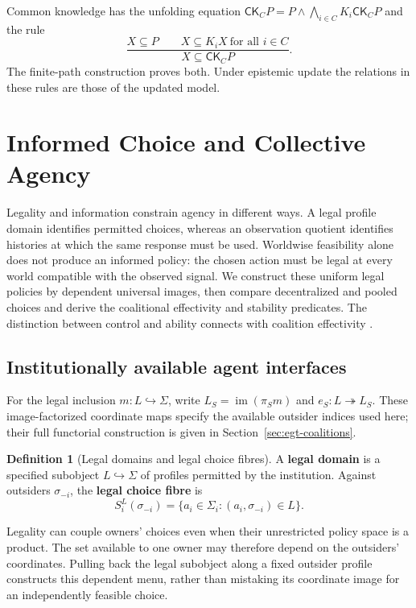 \documentclass[11pt,a4paper]{article}
\numberwithin{equation}{section}
\theoremstyle{definition}
\newtheorem{definition}[theorem]{Definition}
\theoremstyle{remark}
\theoremstyle{plain}
\providecommand{\CK}{\mathsf{CK}}
\begin{document}
Common knowledge has the unfolding equation
$\CK_CP=P\wedge\bigwedge_{i\in C}K_i\CK_CP$ and the rule
\[
 \frac{X\subseteq P\qquad X\subseteq K_iX\ \text{for all }i\in C}
      {X\subseteq\CK_CP}.
\]
The finite-path construction proves both. Under epistemic update the
relations in these rules are those of the updated model.

\section{Informed Choice and Collective Agency}\label{sec:paper-7}

Legality and information constrain agency in different ways. A legal
profile domain identifies permitted choices, whereas an observation
quotient identifies histories at which the same response must be used.
Worldwise feasibility alone does not produce an informed policy: the
chosen action must be legal at every world compatible with the observed
signal. We construct these uniform legal policies by dependent universal
images, then compare decentralized and pooled choices and derive the
coalitional effectivity and stability predicates. The distinction between
control and ability connects with coalition effectivity
\citep{Pauly2002}.

\subsection{Institutionally available agent interfaces}

For the legal inclusion $m:L\hookrightarrow\Sigma$, write
$L_S=\operatorname{im}(\pi_Sm)$ and $e_S:L\twoheadrightarrow L_S$.
These image-factorized coordinate maps specify the available outsider
indices used here; their full functorial construction is given in
Section~\ref{sec:egt-coalitions}.

\begin{definition}[Legal domains and legal choice fibres]
\label{def:egt-legal-domain}
A \textbf{legal domain} is a specified subobject $L\hookrightarrow\Sigma$
of profiles permitted by the institution. Against outsiders $\sigma_{-i}$,
the \textbf{legal choice fibre} is
\[
 S_i^L(\sigma_{-i})=\{a_i\in\Sigma_i:(a_i,\sigma_{-i})\in L\}.
\]
\end{definition}

Legality can couple owners' choices even when their unrestricted
policy space is a product. The set available to one owner may therefore
depend on the outsiders' coordinates. Pulling back the legal subobject
along a fixed outsider profile constructs this dependent menu, rather than
mistaking its coordinate image for an independently feasible choice.
\end{document}
